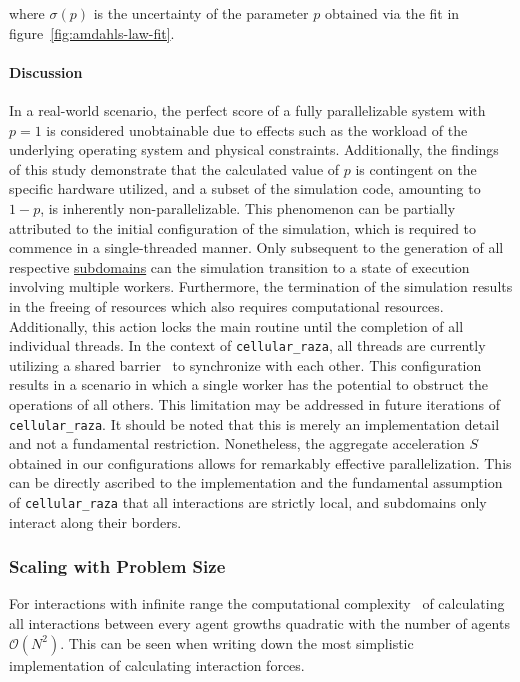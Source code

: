 \documentclass[a4paper]{article}
\begin{document}
where $\sigma(p)$ is the uncertainty of the parameter $p$ obtained via the fit in
figure~\ref{fig:amdahls-law-fit}.

\paragraph{Discussion}
In a real-world scenario, the perfect score of a fully parallelizable system with $p=1$ is
considered unobtainable due to effects such as the workload of the underlying operating system and
physical constraints.
Additionally, the findings of this study demonstrate that the calculated value of $p$ is contingent
on the specific hardware utilized, and a subset of the simulation code, amounting to $1-p$, is
inherently non-parallelizable.
This phenomenon can be partially attributed to the initial configuration of the simulation, which is
required to commence in a single-threaded manner.
Only subsequent to the generation of all respective
\href{https://cellular-raza.com/docs/cellular_raza_core/backend/chili/struct.SubDomainBox.html}
{subdomains} can the simulation transition to a state of execution involving multiple workers.
Furthermore, the termination of the simulation results in the freeing of resources which also
requires computational resources.
Additionally, this action locks the main routine until the completion of all individual threads.
In the context of \texttt{cellular\_raza}, all threads are currently utilizing a shared
barrier~\cite{GjengsetHurdles2018} to synchronize with each other.
This configuration results in a scenario in which a single worker has the potential to obstruct the
operations of all others.
This limitation may be addressed in future iterations of \texttt{cellular\_raza}.
It should be noted that this is merely an implementation detail and not a fundamental restriction.
Nonetheless, the aggregate acceleration $S$ obtained in our configurations allows for remarkably
effective parallelization.
This can be directly ascribed to the implementation and the fundamental assumption of
\texttt{cellular\_raza} that all interactions are strictly local, and subdomains only interact along
their borders.

\subsubsection{Scaling with Problem Size}
For interactions with infinite range the computational complexity~\cite{Knuth1976} of calculating
all interactions between every agent growths quadratic with the number of agents $\mathcal{O}(N^2)$.
This can be seen when writing down the most simplistic implementation of calculating interaction
forces.
\end{document}
